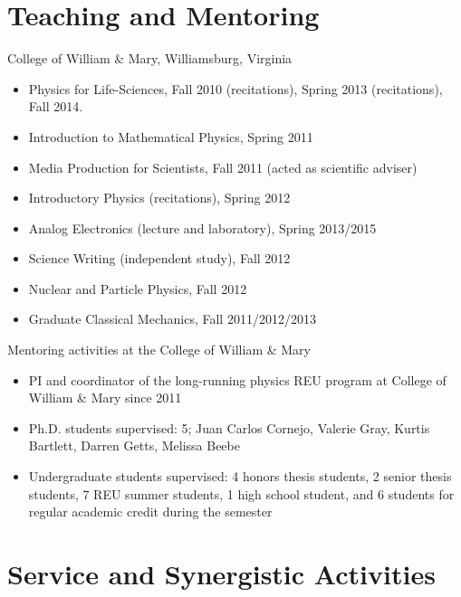 \documentclass[overlapped,line,final,11pt,letterpaper]{res}
\begin{document}
\begin{resume}

\section{\bf Teaching and Mentoring}
\vspace{0.5\baselineskip}

College of William \& Mary, Williamsburg, Virginia
\begin{itemize}
 \item Physics for Life-Sciences, Fall 2010 (recitations), Spring 2013 (recitations), Fall 2014.
 \item Introduction to Mathematical Physics, Spring 2011
 \item Media Production for Scientists, Fall 2011 (acted as scientific adviser)
 \item Introductory Physics (recitations), Spring 2012
 \item Analog Electronics (lecture and laboratory), Spring 2013/2015
 \item Science Writing (independent study), Fall 2012
 \item Nuclear and Particle Physics, Fall 2012
 \item Graduate Classical Mechanics, Fall 2011/2012/2013
\end{itemize}

Mentoring activities at the College of William \& Mary
\begin{itemize}
 \item PI and coordinator of the long-running physics REU program at College of William \& Mary since 2011
 \item Ph.D. students supervised: 5; Juan Carlos Cornejo, Valerie Gray, Kurtis Bartlett, Darren Getts, Melissa Beebe
 \item Undergraduate students supervised: 4 honors thesis students, 2 senior thesis students, 7 REU summer students, 1 high school student, and 6 students for regular academic credit during the semester
\end{itemize}


\section{\bf Service and Synergistic Activities}
\vspace{0.5\baselineskip}


\end{resume}
\end{document}
